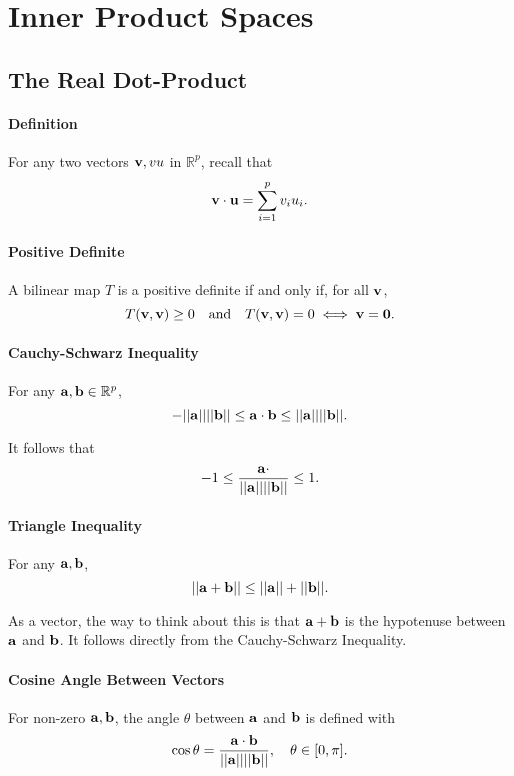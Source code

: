
\section{Inner Product Spaces}

\subsection{The Real Dot-Product}

\paragraph{Definition}

For any two vectors \( \mathbf{v}, vu \) in \( \mathbb{R}^p \), recall that \[
    \mathbf{v} \cdot \mathbf{u} = \sum_{i=1}^p v_i u_i
.\]

\paragraph{Positive Definite}
A bilinear map \( T \) is a positive definite if and only if, for all \( \mathbf{v} \),
\[
    T(\mathbf{v}, \mathbf{v}) \geq 0 \quad\text{and}\quad T(\mathbf{v}, \mathbf{v}) = 0 \iff \mathbf{v} = \mathbf{0}.
\]

\paragraph{Cauchy-Schwarz Inequality}
For any \( \mathbf{a}, \mathbf{b} \in \mathbb{R}^p \), \[
    - ||\mathbf{a}|| ||\mathbf{b}|| \leq \mathbf{a} \cdot \mathbf{b} \leq ||\mathbf{a}|| ||\mathbf{b}||.
\]

It follows that \[
    -1 \leq  \dfrac{\mathbf{a} \cdot}{||\mathbf{a}|| ||\mathbf{b}||} \leq 1.
\]

\paragraph{Triangle Inequality}
For any \( \mathbf{a}, \mathbf{b} \), \[
    ||\mathbf{a} + \mathbf{b}|| \leq ||\mathbf{a}|| + ||\mathbf{b}||.
\]

As a vector, the way to think about this is that \( \mathbf{a} + \mathbf{b} \) is the
hypotenuse between \( \mathbf{a} \) and \( \mathbf{b} \). It follows directly from
the Cauchy-Schwarz Inequality.

\paragraph{Cosine Angle Between Vectors}
For non-zero \( \mathbf{a}, \mathbf{b} \), the angle \( \theta \) between \( \mathbf{a} \)
and \( \mathbf{b} \) is defined with \[
    \cos \theta = \dfrac{\mathbf{a} \cdot \mathbf{b}}{||\mathbf{a}|| ||\mathbf{b}||}, \quad \theta \in [0, \pi].
\]

